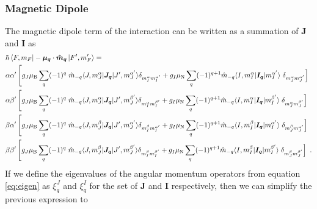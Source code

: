 \documentclass{article}
\begin{document}
\subsubsection{Magnetic Dipole}
The magnetic dipole term of the interaction can be written as a summation of $\mathbf{J}$ and $\mathbf{I}$ as 
\begin{equation}
\begin{split}
       &\hbar\left\langle F, m_F\right|-\boldsymbol{\mu_q}\cdot\boldsymbol{\hat{m}_q}\left|F', m_F'\right\rangle =   \\
       &\alpha \alpha' \left[g_J \mu_{\rm{B}}\sum_q  (-1)^q \right. \hat{m}_{-q}   \langle J,m_J^\alpha|\boldsymbol{J_q}|J', m_J^{\alpha'}\rangle \delta_{m_I^\alpha m_I^{\alpha'}} + g_I \mu_{\rm{N}}\sum_q (-1)^{q+1}\hat{m}_{-q}\langle I,m_I^\alpha|\boldsymbol{I_q}|m_I^{\alpha'}\rangle \left. \delta_{m_J^\alpha m_J^{\alpha'}} \right] \\
        &\alpha \beta' \left[g_J \mu_{\rm{B}}\sum_q  (-1)^q \right. \hat{m}_{-q}   \langle J,m_J^\alpha|\boldsymbol{J_q}|J', m_J^{\beta'}\rangle \delta_{m_I^\alpha m_I^{\beta'}} + g_I \mu_{\rm{N}}\sum_q (-1)^{q+1}\hat{m}_{-q}\langle I,m_I^\alpha|\boldsymbol{I_q}|m_I^{\beta'}\rangle \left. \delta_{m_J^\alpha m_J^{\beta'}} \right] \\ 
        &\beta \alpha' \left[g_J \mu_{\rm{B}}\sum_q  (-1)^q \right. \hat{m}_{-q}   \langle J,m_J^\beta|\boldsymbol{J_q}|J', m_J^{\alpha'}\rangle \delta_{m_I^\beta m_I^{\alpha'}} + g_I \mu_{\rm{N}}\sum_q (-1)^{q+1}\hat{m}_{-q}\langle I,m_I^\beta|\boldsymbol{I_q}|m_I^{\alpha'}\rangle \left. \delta_{m_J^\beta m_J^{\alpha'}} \right] \\ 
        &\beta \beta' \left[g_J \mu_{\rm{B}}\sum_q  (-1)^q \right. \hat{m}_{-q}   \langle J,m_J^\beta|\boldsymbol{J_q}|J', m_J^{\beta'}\rangle \delta_{m_I^\beta m_I^{\beta'}} + g_I \mu_{\rm{N}}\sum_q (-1)^{q+1}\hat{m}_{-q}\langle I,m_I^\beta|\boldsymbol{I_q}|m_I^{\beta'}\rangle \left. \delta_{m_J^\beta m_J^{\beta'}} \right]~.
\end{split}
\end{equation}
If we define the eigenvalues of the angular momentum operators from equation \ref{eq:eigen} as $\xi^J_q$ and $\xi^I_q$ for the set of $\mathbf{J}$ and $\mathbf{I}$ respectively, then we can simplify the previous expression to 
\end{document}
